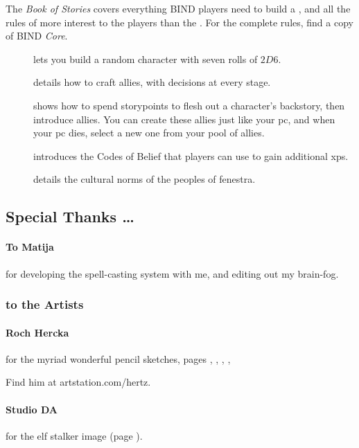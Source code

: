 \begin{multicols}{2}
The \textit{Book of Stories} covers everything BIND players need to build a , and all the rules of more interest to the players than the .
For the complete rules, find a copy of BIND \textit{Core}.

\begin{description}
  \item[]
  lets you build a random character with seven rolls of $2D6$.
  \item[]
  details how to craft allies, with decisions at every stage.
  \item[] shows how to spend \glspl{storypoint} to flesh out a character's backstory, then introduce allies.
  You can create these allies just like your \gls{pc}, and when your \gls{pc} dies, select a new one from your pool of allies.
  \item[] introduces the Codes of Belief that players can use to gain additional \glspl{xp}.
  \item[] details the cultural norms of the peoples of \gls{fenestra}.
\end{description}

\subsection*{Special Thanks \ldots}

\paragraph{To Matija}
for developing the spell-casting system with me, and editing out my brain-fog.

\subsubsection*{to the Artists}

\paragraph{Roch Hercka} for the myriad wonderful pencil sketches, pages 
\pageref{Roch_Hercka/five_races}, 
\pageref{Roch_Hercka/illusion_trogdor}, 
\pageref{Roch_Hercka/xp-1}, 
\pageref{Roch_Hercka/xp-2}, 

Find him at artstation.com/hertz.

\paragraph{Studio DA}
for the elf stalker image
(page \pageref{Studio_DA/elf_stalker}).


\end{multicols}
